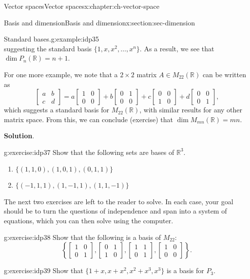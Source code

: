 \documentclass[oneside,10pt,]{book}
\newcommand{\blocktitlefont}{\relax}
\numberwithin{equation}{section}
\newcommand{\bbm}{\begin{bmatrix}}
\newcommand{\ebm}{\end{bmatrix}}
\newcommand{\R}{\mathbb{R}}
\newcommand{\amp}{&}
\begin{document}
\begin{chapterptx}{Vector spaces}{}{Vector spaces}{}{}{x:chapter:ch-vector-space}
\begin{sectionptx}{Basis and dimension}{}{Basis and dimension}{}{}{x:section:sec-dimension}
\begin{example}{Standard bases.}{g:example:idp35}
\begin{equation*}
\end{equation*}
suggesting the standard basis \(\{1,x,x^2,\ldots, x^n\}\). As a result, we see that \(\dim P_n(\R)=n+1\).%
\par
For one more example, we note that a \(2\times 2\) matrix \(A\in M_{22}(\R)\) can be written as%
\begin{equation*}
\bbm a\amp b\\c\amp d\ebm = a\bbm 1\amp 0\\0\amp 0\ebm+b\bbm 0\amp 1\\0\amp 0\ebm +c\bbm 0\amp 0\\1\amp 0\ebm + d\bbm 0\amp 0\\0\amp 1\ebm\text{,}
\end{equation*}
which suggests a standard basis for \(M_{22}(\R)\), with similar results for any other matrix space. From this, we can conclude (exercise) that \(\dim M_{mn}(\R)=mn\).%
\par\smallskip%
\noindent\textbf{\blocktitlefont Solution}.\hypertarget{g:solution:idp36}{}\quad{}%
\end{example}
\begin{inlineexercise}{}{g:exercise:idp37}%
Show that the following sets are bases of \(\R^3\).%
\begin{enumerate}[font=\bfseries,label=(\alph*),ref=\alph*]
\item{}\(\{(1,1,0),(1,0,1),(0,1,1)\}\)%
\item{}\(\{(-1,1,1),(1,-1,1),(1,1,-1)\}\)%
\end{enumerate}
\end{inlineexercise}%
The next two exercises are left to the reader to solve. In each case, your goal should be to turn the questions of independence and span into a system of equations, which you can then solve using the computer.%
\begin{inlineexercise}{}{g:exercise:idp38}%
Show that the following is a basis of \(M_{22}\):%
\begin{equation*}
\left\{\bbm 1\amp 0\\0\amp 1\ebm, \bbm 0\amp 1\\1\amp 0\ebm, \bbm 1\amp 1\\0\amp 1\ebm, \bbm 1\amp 0\\0\amp 0\ebm\right\}\text{.}
\end{equation*}
%
\end{inlineexercise}%
\begin{inlineexercise}{}{g:exercise:idp39}%
Show that \(\{1+x,x+x^2,x^2+x^3,x^3\}\) is a basis for \(P_3\).%

\end{inlineexercise}
\end{sectionptx}
\end{chapterptx}
\end{document}
